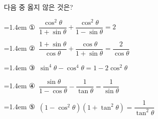 다음 중 옳지 않은 것은?
\par\medskip\par\noindent\hangindent=1.4em {\small ①}\ $\dfrac{\cos^{2}\theta}{1+\sin\theta}+\dfrac{\cos^{2}\theta}{1-\sin\theta}=2$\par\noindent\hangindent=1.4em {\small ②}\ $\dfrac{1+\sin\theta}{\cos\theta}+\dfrac{\cos\theta}{1+\sin\theta}=\dfrac{2}{\cos\theta}$\par\noindent\hangindent=1.4em {\small ③}\ $\sin^{4}\theta-\cos^{4}\theta=1-2\cos^{2}\theta$\par\noindent\hangindent=1.4em {\small ④}\ $\dfrac{\sin\theta}{1-\cos\theta}-\dfrac{1}{\tan\theta}=\dfrac{1}{\sin\theta}$\par\noindent\hangindent=1.4em {\small ⑤}\ $(1-\cos^{2}\theta)(1+\tan^{2}\theta)=\dfrac{1}{\tan^{2}\theta}$\par\medskip
